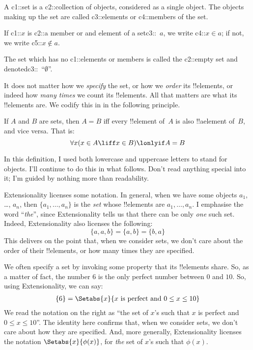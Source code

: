 A {{c1::set}} is a {{c2::collection of objects}}, considered as a single object. The objects making up the set are called {{c3::elements}} or {{c4::members}} of the set. 

If {{c1::$x$}} is {{c2::a member or and element}} of a set{{c3::~$a$}}, we write {{c4::$x \in a$}}; if not, we write {{c5::$x \notin a$}}. 

The set which has no {{c1::elements or members}} is called the {{c2::empty set}} and denoted{{c3::~``$\emptyset$''}}.

It does not matter how we \emph{specify} the set, or how we \emph{order} its !!{element}s, or indeed how \emph{many times} we count its !!{element}s. All that matters are what its !!{element}s are. We codify this in in the following principle.
\begin{defn}[Extensionality]
	If $A$ and $B$ are sets, then $A = B$ iff every !!{element} of~$A$ is also !!a{element} of~$B$, and
	vice versa. That is: $$\forall x(x \in A \liff x \in B) \lonlyif A = B$$
\end{defn}\noindent
In this definition, I used both lowercase and uppercase letters to stand for objects. I'll continue to do this in what follows. Don't read anything special into it; I'm guided by nothing more than readability.

Extensionality licenses some notation. In general, when we have some objects $a_{1}$, \dots, $a_{n}$, then $\{a_{1}, \dots, a_{n}\}$ is the \emph{set} whose !!{element}s are $a_1, \ldots, a_n$. I emphasise the word ``\emph{the}'', since Extensionality tells us that there can be only \emph{one} such set. Indeed, Extensionality also licenses the following:
	$$\{a, a, b\} = \{a, b\} = \{b,a\}$$
This delivers on the point that, when we consider sets, we don't care about the order of their !!{element}s, or how many times they are specified.  

We often specify a set by invoking some property that its !!{element}s share. So, as a matter of fact, the number $6$ is the only perfect number between $0$ and $10$. So, using Extensionality, we can say:
\begin{align*}
	\{6\} =\Setabs{x}{x\text{ is perfect and }0 \leq x \leq 10}
\end{align*}
We read the notation on the right as ``the set of $x$'s such that $x$ is perfect and $0 \leq x \leq 10$''. The identity here confirms that, when we consider sets, we don't care about how they are specified. And, more generally, Extensionality licenses the notation $\Setabs{x}{\phi(x)}$, for \emph{the} set of $x$'s such that $\phi(x)$.

